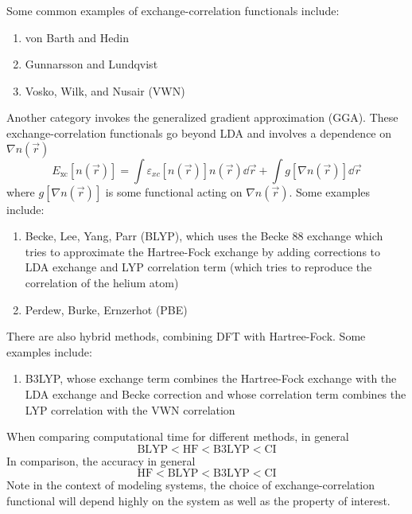 \documentclass[12pt,a4paper,titlepage]{article}
\newcommand{\trm}[1]{\textrm{#1}} %
\begin{document}
Some common examples of exchange-correlation functionals include:
\begin{enumerate}
\item von Barth and Hedin
\item Gunnarsson and Lundqvist
\item Vosko, Wilk, and Nusair (VWN)
\end{enumerate}
Another category invokes the generalized gradient approximation (GGA). These exchange-correlation functionals go beyond LDA and involves a dependence on $\nabla n(\vec{r})$
\begin{equation}
E_{\trm{xc}}[n(\vec{r})]=\int\varepsilon_{xc}[n(\vec{r})]n(\vec{r})\dd{\vec{r}}+\int g[\nabla n(\vec{r})]\dd{\vec{r}}
\end{equation}
where $g[\nabla n(\vec{r})]$ is some functional acting on $\nabla n(\vec{r})$. Some examples include:
\begin{enumerate}
\item Becke, Lee, Yang, Parr (BLYP), which uses the Becke 88 exchange which tries to approximate the Hartree-Fock exchange by adding corrections to LDA exchange and LYP correlation term (which tries to reproduce the correlation of the helium atom)
\item Perdew, Burke, Ernzerhot (PBE)
\end{enumerate}
There are also hybrid methods, combining DFT with Hartree-Fock. Some examples include:
\begin{enumerate}
\item B3LYP, whose exchange term combines the Hartree-Fock exchange with the LDA exchange and Becke correction and whose correlation term combines the LYP correlation with the VWN correlation
\end{enumerate}
When comparing computational time for different methods, in general
\[
\trm{BLYP}<\trm{HF}<\trm{B3LYP}<\trm{CI}
\]
In comparison, the accuracy in general
\[
\trm{HF}<\trm{BLYP}<\trm{B3LYP}<\trm{CI}
\]
Note in the context of modeling systems, the choice of exchange-correlation functional will depend highly on the system as well as the property of interest.
\end{document}
